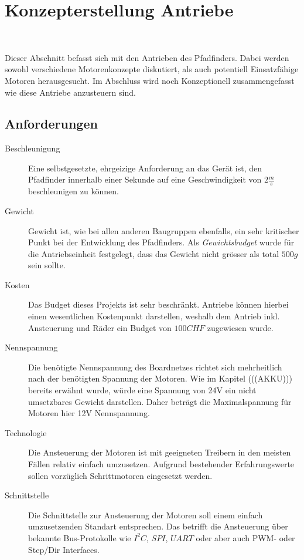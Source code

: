 \documentclass[main.tex]{subfiles} %
\begin{document}
\section{Konzepterstellung Antriebe}~\label{appendix:Antriebe}

Dieser Abschnitt befasst sich mit den Antrieben des Pfadfinders. Dabei werden
sowohl verschiedene Motorenkonzepte diskutiert, als auch potentiell
Einsatzfähige Motoren herausgesucht. Im Abschluss wird noch Konzeptionell
zusammengefasst wie diese Antriebe anzusteuern sind.

\subsection*{Anforderungen}

\begin{description}
    \item[Beschleunigung] Eine selbstgesetzte, ehrgeizige Anforderung an das Gerät ist,
          den Pfadfinder innerhalb einer Sekunde auf eine Geschwindigkeit von $2
              \frac{m}{s} $ beschleunigen zu können.

    \item[Gewicht] Gewicht ist, wie bei allen anderen Baugruppen ebenfalls, ein sehr
          kritischer Punkt bei der Entwicklung des Pfadfinders. Als
          \textit{Gewichtsbudget} wurde für die Antriebseinheit festgelegt, dass das
          Gewicht nicht grösser als total $500 g$ sein sollte.

    \item[Kosten] Das Budget dieses Projekts ist sehr beschränkt. Antriebe können hierbei
          einen wesentlichen Kostenpunkt darstellen, weshalb dem Antrieb inkl.
          Ansteuerung und Räder ein Budget von $100 CHF$ zugewiesen wurde.

    \item[Nennspannung] Die benötigte Nennspannung des Boardnetzes richtet sich
          mehrheitlich nach der benötigten Spannung der Motoren. Wie im Kapitel
          (((AKKU))) bereits erwähnt wurde, würde eine Spannung von 24V ein nicht
          umsetzbares Gewicht darstellen. Daher beträgt die Maximalspannung für Motoren
          hier 12V Nennspannung.

    \item[Technologie] Die Ansteuerung der Motoren ist mit geeigneten Treibern in den
          meisten Fällen relativ einfach umzusetzen. Aufgrund bestehender Erfahrungswerte
          sollen vorzüglich Schrittmotoren eingesetzt werden.

    \item[Schnittstelle] Die Schnittstelle zur Ansteuerung der Motoren soll einem einfach
          umzusetzenden Standart entsprechen. Das betrifft die Ansteuerung über bekannte
          Bus-Protokolle wie $I^2C$, $SPI$, $UART$ oder aber auch PWM- oder Step/Dir
          Interfaces.

\end{description}
\end{document}
